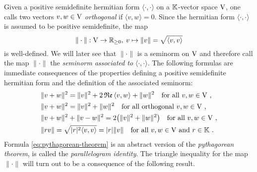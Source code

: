 \para \label{para:properties-seminorm-associated-positive-semidefinite-hermitian-form}
Given a positive semidefinite hermitian form $\langle \cdot , \cdot \rangle$ on a 
$\mathbb{K}$-vector space $\mathrm{V}$, one calls two vectors $v,w \in \mathrm{V}$ \emph{orthogonal} 
if $\langle v , w \rangle = 0$. Since the hermitian form 
$\langle \cdot , \cdot \rangle$ is assumed to be positive semidefinite, the map 
\[
 \| \cdot \| : \mathrm{V} \to \mathbb{R}_{\geq 0} , \: v \mapsto \|v \| = \sqrt{\langle v , v \rangle} 
\]
is well-defined. We will later see that $\| \cdot \|$  is a seminorm on $\mathrm{V}$
and therefore call the map $\| \cdot \|$ the \emph{seminorm associated to}
$\langle \cdot , \cdot \rangle$. The following formulas are immediate consequences of the 
properties defining a positive semidefinite hermitian form and the definition
of the associated seminorm: 
\begin{align} 
  \label{eq:norm-squared-sum}
  & \| v+w \|^2  = \| v\|^2 + 2\, \mathfrak{Re} \, \langle  v ,  w \rangle + \| w\|^2 \quad \text{for all } 
  v,w \in \mathrm{V} \ , \\
  \label{eq:pythagorean-theorem}
  & \| v+w \|^2  = \| v\|^2 + \| w\|^2 \quad \text{for all orthogonal } v,w \in \mathrm{V} \ ,  \\
  \label{eq:parallelogram-identity} 
  & \| v+w \|^2  + \|v-w\|^2  = 2 \big( \| v\|^2 + \| w\|^2 \big) \quad \text{for all } v,w \in \mathrm{V}\ ,\\
  \label{eq:absolute-homogeneity} 
  & \| rv \| = \sqrt{ |r|^2 \langle  v ,  v \rangle }  = |r| \| v \| 
  \quad \text{for all } v,w \in \mathrm{V} \text{ and } r\in \mathbb{K} \ .
\end{align} 
Formula \eqref{eq:pythagorean-theorem} is an abstract version of the \emph{pythagorean theorem},
 is called the \emph{parallelogram identity}. 
The triangle inequality for the map $\| \cdot \|$  will turn out to be a consequence of the 
following result. 

